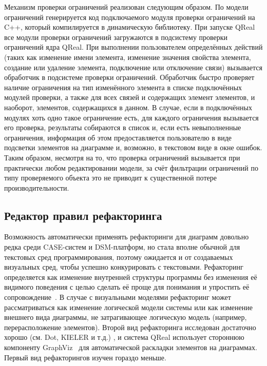 Механизм проверки ограничений реализован следующим образом. По модели ограничений 
генерируется код подключаемого модуля проверки ограничений на C++, который компилируется 
в динамическую библиотеку. При запуске QReal все модули проверки ограничений загружаются 
в подсистему проверки ограничений ядра QReal. При выполнении пользователем определённых 
действий (таких как изменение имени элемента, изменение значения свойства элемента, 
создание или удаление элемента, подключение или отключение связи) вызывается обработчик 
в подсистеме проверки ограничений. Обработчик быстро проверяет наличие ограничения 
на тип изменённого элемента в списке подключённых модулей проверки, а также для всех 
связей и содержащих элемент элементов, и наоборот, элементов, содержащихся в данном. 
В случае, если в подключённых модулях хоть одно такое ограничение есть, для каждого 
ограничения вызывается его проверка, результаты собираются в список и, если есть невыполненные 
ограничения, информация об этом предоставляется пользователю в виде подсветки элементов 
на диаграмме и, возможно, в текстовом виде в окне ошибок. Таким образом, несмотря на то, 
что проверка ограничений вызывается при практически любом редактировании модели, за 
счёт фильтрации ограничений по типу проверяемого объекта это не приводит к существенной 
потере производительности.

\subsection{Редактор правил рефакторинга}
Возможность автоматически применять рефакторинги для диаграмм довольно редка среди CASE-систем и \ac{DSM}-платформ, 
но стала вполне обычной для текстовых сред программирования, поэтому ожидается и от создаваемых визуальных сред, чтобы успешно конкурировать с текстовыми. 
Рефакторинг определяется как изменение внутренней структуры программы без изменения 
её видимого поведения с целью сделать её проще для понимания и упростить её сопровождение~\cite{fowler2003refactoring}. 
В случае с визуальными моделями рефакторинг может рассматриваться как изменение логической 
модели системы или как изменение внешнего вида диаграммы, не затрагивающее логическую 
модель (например, перерасположение элементов). Второй вид рефакторинга исследован 
достаточно хорошо (см. Dot, KIELER и т.д.)%
, и система QReal использует стороннюю компоненту GraphViz~\cite{graphViz}
для автоматической раскладки элементов на диаграммах. Первый вид рефакторингов изучен 
гораздо меньше.

